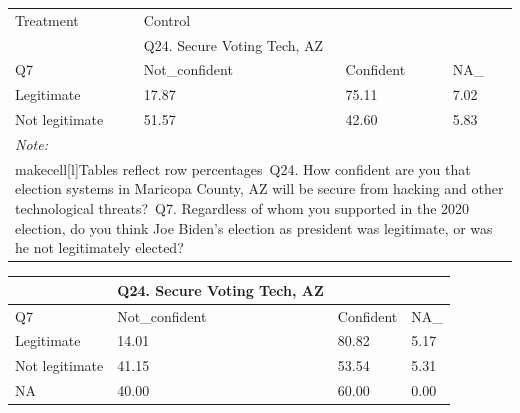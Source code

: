 \documentclass[
  11pt,
  a4paper,
]{article}
\begin{document}
\begin{table}
\centering
\centering
\begin{tabular}[t]{l|l|l|l}
\hline
\multicolumn{1}{l|}{Treatment} & \multicolumn{1}{l}{Control} \\
\cline{1-1} \cline{2-2}
 & Q24. Secure Voting Tech, AZ &  & \\
\hline
Q7 & Not\_confident & Confident & NA\_\\
\hline
Legitimate & 17.87 & 75.11 & 7.02\\
\hline
Not legitimate & 51.57 & 42.60 & 5.83\\
\hline
\multicolumn{4}{l}{\rule{0pt}{1em}\textit{Note: }}\\
\multicolumn{4}{l}{\rule{0pt}{1em}makecell[l]{Tables reflect row percentages\ Q24. How confident are you that election systems in Maricopa County, AZ will be secure from hacking and other technological threats?\ Q7. Regardless of whom you supported in the 2020 election, do you think Joe Biden's election as president was legitimate, or was he not legitimately elected?}}\\
\end{tabular}
\centering
\begin{tabular}[t]{l|l|l|l}
\hline
 & Q24. Secure Voting Tech, AZ &  & \\
\hline
Q7 & Not\_confident & Confident & NA\_\\
\hline
Legitimate & 14.01 & 80.82 & 5.17\\
\hline
Not legitimate & 41.15 & 53.54 & 5.31\\
\hline
NA & 40.00 & 60.00 & 0.00\\
\hline
\end{tabular}
\end{table}
\end{document}
